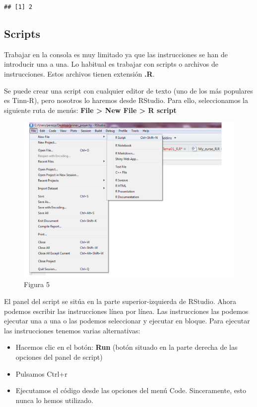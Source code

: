 \documentclass[
]{book}
\begin{document}
\begin{verbatim}
## [1] 2
\end{verbatim}

\hypertarget{scripts}{%
\subsection{Scripts}\label{scripts}}

Trabajar en la consola es muy limitado ya que las instrucciones se han de introducir una a una. Lo habitual es trabajar con scripts o archivos de instrucciones. Estos archivos tienen extensión \textbf{.R}.

Se puede crear una script con cualquier editor de texto (uno de los más populares es Tinn-R), pero nosotros lo haremos desde RStudio. Para ello, seleccionamos la siguiente ruta de menús: \textbf{File \textgreater{} New File \textgreater{} R script}

\begin{figure}
\centering
\includegraphics{imagenes/06.png}
\caption{Figura 5}
\end{figure}

El panel del script se sitúa en la parte superior-izquierda de RStudio. Ahora podemos escribir las instrucciones línea por línea. Las instrucciones las podemos ejecutar una a una o las podemos seleccionar y ejecutar en bloque. Para ejecutar las instrucciones tenemos varias alternativas:

\begin{itemize}
\item
  Hacemos clic en el botón: \textbf{Run} (botón situado en la parte derecha de las opciones del panel de script)
\item
  Pulsamos Ctrl+r
\item
  Ejecutamos el código desde las opciones del menú Code. Sinceramente, esto nunca lo hemos utilizado.
\end{itemize}
\end{document}
